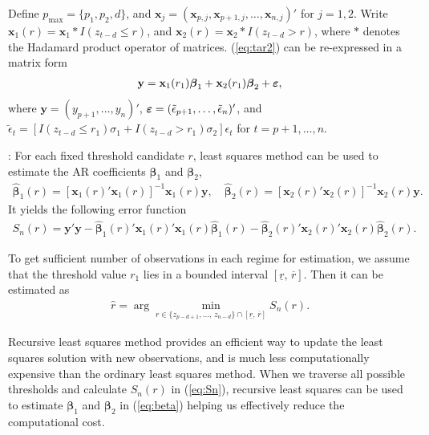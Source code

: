 Define $p_{\max}=\{p_1,p_2, d\}$, and ${\mathbf x}_j=({\mathbf x}_{p,j},{\mathbf x}_{p+1,j},\ldots, {\mathbf x}_{n,j})'$ for $j=1,2$. Write ${\mathbf x}_1(r)={\mathbf x}_1 * I(z_{t-d}\leq r)$, and ${\mathbf x}_2(r)={\mathbf x}_2 * I(z_{t-d}>r)$, where $*$ denotes the Hadamard product operator of matrices. (\ref{eq:tar2}) can be re-expressed in a matrix form
\begin{align}\label{eq:tar_mat}
{\mathbf y}={\mathbf x}_1(r_1) \boldsymbol{\beta}_1+{\mathbf x}_2(r_1)\boldsymbol{\beta}_2+\mbox{\boldmath$\varepsilon$},
\end{align}
where ${\mathbf y}=(y_{p+1},\ldots,y_n)'$, $\mbox{\boldmath$\varepsilon$}=(\tilde{\epsilon}_{p+1},\ldots,\tilde{\epsilon}_n)'$, and $\tilde{\epsilon}_t=[I(z_{t-d}\leq r_1) \sigma_1+I(z_{t-d}>r_1) \sigma_2]\epsilon_t$ for $t=p+1,\ldots, n$.

: For each fixed threshold candidate $r$, least squares method can be used to estimate the AR coefficients $\boldsymbol{\beta}_1$ and $\boldsymbol{\beta}_2$,
\begin{align}\label{eq:beta}
\hat{\boldsymbol{\beta}}_1(r)= [{\mathbf x}_1(r)' {\mathbf x}_1(r)]^{-1}{\mathbf x}_1(r) {\mathbf y}, \quad \hat{\boldsymbol{\beta}}_2(r)= [{\mathbf x}_2(r)' {\mathbf x}_2(r)]^{-1}{\mathbf x}_2(r) {\mathbf y}.
\end{align}
It yields the following error function
\begin{align}\label{eq:Sn}
S_n(r)={\mathbf y}' {\mathbf y}- \hat{\boldsymbol{\beta}}_1(r)'{\mathbf x}_1(r)' {\mathbf x}_1(r) \hat{\boldsymbol{\beta}}_1(r) - \hat{\boldsymbol{\beta}}_2(r)'{\mathbf x}_2(r)' {\mathbf x}_2(r) \hat{\boldsymbol{\beta}}_2(r).
\end{align}

To get sufficient number of observations in each regime for estimation, we assume that the threshold value $r_1$ lies in a bounded interval $[\underline{r}, \,\overline{r}]$. Then it can be estimated as
\begin{align}\label{eq:obj}
\hat{r}=\arg \min_{r \in \{z_{p-d+1},\ldots,\, z_{n-d}\} \cap [\underline{r},\, \overline{r}]} S_n(r).
\end{align}

 Recursive least squares method provides an efficient way to update the least squares solution with new observations, and is much less computationally expensive than the ordinary least squares method. When we traverse all possible thresholds and calculate $S_n(r)$ in (\ref{eq:Sn}),  recursive least squares can be used to estimate $\boldsymbol{\beta}_1$ and $\boldsymbol{\beta}_2$ in (\ref{eq:beta}) helping us effectively reduce the computational cost. 


